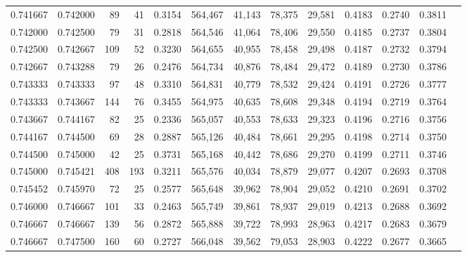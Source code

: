\begin{tabular}{rrrrrrrrrrrrr}
0.741667 & 0.742000 &    89 &  41 &                                     0.3154 & 564,467 &  41,143 &  78,375 &  29,581 & 0.4183 & 0.2740 & 0.3811 \\
0.742000 & 0.742500 &    79 &  31 &                                     0.2818 & 564,546 &  41,064 &  78,406 &  29,550 & 0.4185 & 0.2737 & 0.3804 \\
0.742500 & 0.742667 &   109 &  52 &                                     0.3230 & 564,655 &  40,955 &  78,458 &  29,498 & 0.4187 & 0.2732 & 0.3794 \\
0.742667 & 0.743288 &    79 &  26 &                                     0.2476 & 564,734 &  40,876 &  78,484 &  29,472 & 0.4189 & 0.2730 & 0.3786 \\
0.743333 & 0.743333 &    97 &  48 &                                     0.3310 & 564,831 &  40,779 &  78,532 &  29,424 & 0.4191 & 0.2726 & 0.3777 \\
0.743333 & 0.743667 &   144 &  76 &                                     0.3455 & 564,975 &  40,635 &  78,608 &  29,348 & 0.4194 & 0.2719 & 0.3764 \\
0.743667 & 0.744167 &    82 &  25 &                                     0.2336 & 565,057 &  40,553 &  78,633 &  29,323 & 0.4196 & 0.2716 & 0.3756 \\
0.744167 & 0.744500 &    69 &  28 &                                     0.2887 & 565,126 &  40,484 &  78,661 &  29,295 & 0.4198 & 0.2714 & 0.3750 \\
0.744500 & 0.745000 &    42 &  25 &                                     0.3731 & 565,168 &  40,442 &  78,686 &  29,270 & 0.4199 & 0.2711 & 0.3746 \\
0.745000 & 0.745421 &   408 & 193 &                                     0.3211 & 565,576 &  40,034 &  78,879 &  29,077 & 0.4207 & 0.2693 & 0.3708 \\
0.745452 & 0.745970 &    72 &  25 &                                     0.2577 & 565,648 &  39,962 &  78,904 &  29,052 & 0.4210 & 0.2691 & 0.3702 \\
0.746000 & 0.746667 &   101 &  33 &                                     0.2463 & 565,749 &  39,861 &  78,937 &  29,019 & 0.4213 & 0.2688 & 0.3692 \\
0.746667 & 0.746667 &   139 &  56 &                                     0.2872 & 565,888 &  39,722 &  78,993 &  28,963 & 0.4217 & 0.2683 & 0.3679 \\
0.746667 & 0.747500 &   160 &  60 &                                     0.2727 & 566,048 &  39,562 &  79,053 &  28,903 & 0.4222 & 0.2677 & 0.3665 \\

\end{tabular}

